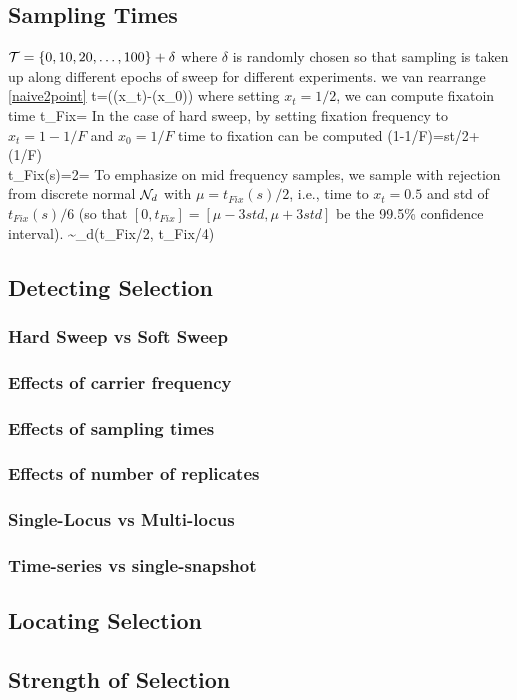 \documentclass[11pt]{article}
\begin{document}
\subsection{Sampling Times}
${\cal T}=\{0,10,20,\ldots ,100\} + \delta$ where $\delta$ is randomly chosen so 
that sampling is taken up along different epochs of sweep for different 
experiments.
we van rearrange \eqref{naive2point}
\beq
t=(\nu(x_t)-\nu(x_0))
\eeq
where setting $x_t=1/2$, we can compute fixatoin time 
\beq
t_{Fix}=
\eeq
In the case of hard sweep, by setting fixation frequency to $x_t=1-1/F$ and 
$x_0=1/F$ time to fixation can be computed
\beq
\eta(1-1/F)=st/2+\eta(1/F)\\
t_{Fix}(s)=2=
\eeq
To emphasize on mid frequency samples, we sample with rejection from 
discrete normal ${\cal N}_d$ with $\mu=t_{Fix}(s)/2$, i.e., time to $x_t=0.5$ and 
std of $t_{Fix}(s)/6$ (so that $[0,t_{Fix}]=[\mu-3std, \mu+3std]$ be the 
99.5\% confidence interval).
\beq
\delta \sim \Nc_d(t_{Fix}/2, t_{Fix}/4)
\eeq


\subsection{Detecting Selection}
\subsubsection{Hard Sweep vs Soft Sweep}
\subsubsection{Effects of carrier frequency}
\subsubsection{Effects of sampling times}
\subsubsection{Effects of number of replicates}
\subsubsection{Single-Locus vs Multi-locus}
\subsubsection{Time-series vs single-snapshot}

\subsection{Locating Selection}

\subsection{Strength of  Selection}

%
%
%
%



\end{document}
